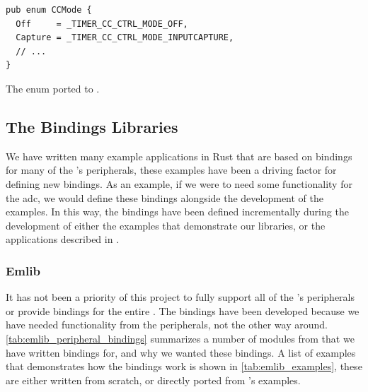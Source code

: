 \begin{listing}[h]
\begin{verbatim}
pub enum CCMode {
  Off     = _TIMER_CC_CTRL_MODE_OFF,
  Capture = _TIMER_CC_CTRL_MODE_INPUTCAPTURE,
  // ...
}
\end{verbatim}
\caption{The enum ported to {\rust}.}
\label{lst:enum_naming_rust}
\end{listing}

\subsection{The Bindings Libraries}
\label{ssub:the_bindings_library}

We have written many example applications in Rust that are based on bindings for many of the {\gecko}'s peripherals, these examples have been a driving factor for defining new bindings.
As an example, if we were to need some functionality for the \gls{adc}, we would define these bindings alongside the development of the examples.
In this way, the bindings have been defined incrementally during the development of either the examples that demonstrate our libraries, or the applications described in .

\subsubsection{Emlib}

It has not been a priority of this project to fully support all of the {\gecko}'s peripherals or provide bindings for the entire {\emlib}.
The bindings have been developed because we have needed functionality from the peripherals, not the other way around.
\autoref{tab:emlib_peripheral_bindings} summarizes a number of modules from {\emlib} that we have written bindings for, and why we wanted these bindings.
A list of examples that demonstrates how the bindings work is shown in \autoref{tab:emlib_examples}, these are either written from scratch, or directly ported from {\emlib}'s examples.

